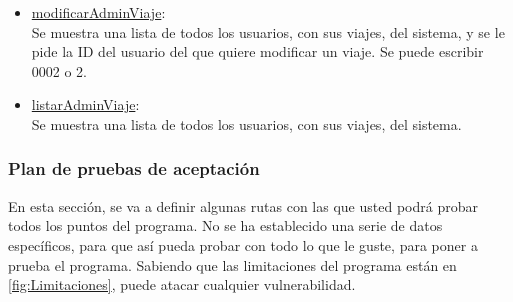 \begin{itemize}
  \item \href{DOC_DOXYGEN/modificar_8c_source.html}{modificarAdminViaje}:\\
  Se muestra una lista de todos los usuarios, con sus viajes, del sistema, y se le pide la ID del usuario del que quiere modificar un viaje. Se puede escribir 0002 o 2.

  \item \href{DOC_DOXYGEN/listar_8c_source.html}{listarAdminViaje}:\\
  Se muestra una lista de todos los usuarios, con sus viajes, del sistema.
\end{itemize}

\subsubsection{Plan de pruebas de aceptación}

En esta sección, se va a definir algunas rutas con las que usted podrá probar todos los puntos del programa. No se ha establecido una serie de datos específicos, para que así pueda probar con
todo lo que le guste, para poner a prueba el programa. Sabiendo que las limitaciones del programa están en \ref{fig:Limitaciones}, puede atacar cualquier vulnerabilidad.

\bigskip

